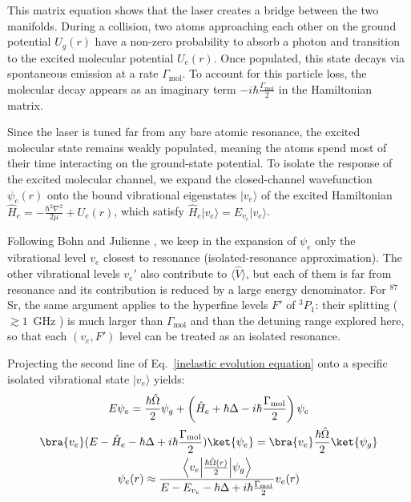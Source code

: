 This matrix equation shows that the laser creates a bridge between the two manifolds. During a collision, two atoms approaching each other on the ground potential $U_g(r)$ have a non-zero probability to absorb a 
photon and transition to the excited molecular potential $U_e(r)$. Once populated, this state decays via spontaneous emission at a rate $\Gamma_{\text{mol}}$. To account for this particle loss, the molecular decay appears as an imaginary term $-i\hbar\frac{\Gamma_{\text{mol}}}{2}$ in the Hamiltonian matrix.

Since the laser is tuned far from any bare atomic resonance, the excited molecular state remains weakly populated, meaning the atoms spend most of their time interacting on the ground-state potential.
To isolate the response of the excited molecular channel, we expand the closed-channel wavefunction $\psi_e(r)$ onto the bound vibrational eigenstates $\vert{}v_e\rangle$ of the excited Hamiltonian 
$\hat{H}_e = -\frac{\hbar^2\nabla^2}{2\mu} + U_e(r)$, which satisfy $\hat{H}_e \vert{}v_e\rangle = E_{v_e} \vert{}v_e\rangle$.

Following Bohn and Julienne \cite{bohn1997_prospects}, we keep in the expansion of
$\psi_e$ only the vibrational level $v_e$ closest to resonance (isolated-resonance
approximation). The other vibrational levels $v_e'$ also contribute to
$\langle\hat V\rangle$, but each of them is far from resonance and its contribution is
reduced by a large energy denominator. For $^{87}$Sr, the same argument applies to the
hyperfine levels $F'$ of $^3P_1$: their splitting ($\gtrsim1$~GHz
\cite{stellmerThesis}) is much larger than $\Gamma_{\text{mol}}$ and than the detuning
range explored here, so that each $(v_e,F')$ level can be treated as an isolated
resonance.

Projecting the second line of Eq.~\ref{inelastic evolution equation} onto a specific 
isolated vibrational state $\vert{}v_e\rangle$ yields:
\begin{gather}
E \psi_e = \frac{\hbar \hat{\Omega}}{2}\psi_g + \left(\hat{H}_e + \hbar \Delta - i\hbar \frac{\Gamma_{\text{mol}}}{2} \right)\psi_e\\
\bra{v_e}(E-\hat{H}_e - \hbar \Delta + i\hbar \frac{\Gamma_{\text{mol}}}{2})\ket{\psi_e} = \bra{v_e}\frac{\hbar\hat{\Omega}}{2}\ket{\psi_g}\\
\psi_e(r) \approx \frac{\left\langle v_e \middle| \frac{\hbar\hat{\Omega}(r)}{2} \middle| \psi_g \right\rangle}{E - E_{v_e} - \hbar\Delta + i\hbar\frac{\Gamma_{\text{mol}}}{2}} v_e(r)
\end{gather}

